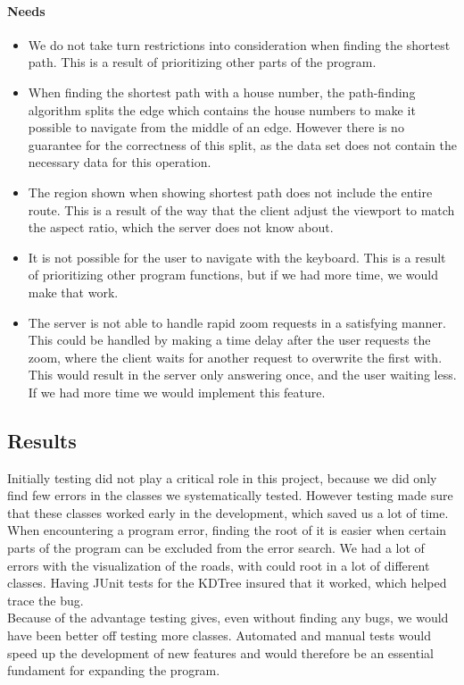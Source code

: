 \documentclass[a4paper,10pt,titlepage]{article}
\begin{document}
\paragraph{Needs}
\begin{itemize}
\item We do not take turn restrictions into consideration when finding the shortest path. This is a result of prioritizing other parts of the program.

\item When finding the shortest path with a house number, the path-finding algorithm splits the edge which contains the house numbers to make it possible to navigate from the middle of an edge. However there is no guarantee for the correctness of this split, as the data set does not contain the necessary data for this operation.

\item The region shown when showing shortest path does not include the entire route. This is a result of the way that the client adjust the viewport to match the aspect ratio, which the server does not know about.

\item It is not possible for the user to navigate with the keyboard. This is a result of prioritizing other program functions, but if we had more time, we would make that work.

\item The server is not able to handle rapid zoom requests in a satisfying manner. This could be handled by making a time delay after the user requests the zoom, where the client waits for another request to overwrite the first with. This would result in the server only answering once, and the user waiting less. If we had more time we would implement this feature.
		\end{itemize}
			
		\subsection{Results}
		Initially testing did not play a critical role in this project, because we did only find few errors in the classes we systematically tested. However testing made sure that these classes worked early in the development, which saved us a lot of time. When encountering a program error, finding the root of it is easier when certain parts of the program can be excluded from the error search. We had a lot of errors with the visualization of the roads, with could root in a lot of different classes. Having JUnit tests for the KDTree insured that it worked, which helped trace the bug.\\
		Because of the advantage testing gives, even without finding any bugs, we would have been better off testing more classes. Automated and manual tests would speed up the development of new features and would therefore be an essential fundament for expanding the program. 
\end{document}
